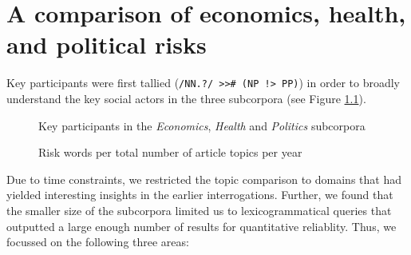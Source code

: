 
\chapter{A comparison of economics, health, and political risks}


Key participants were first tallied (\texttt{/NN.?/ \textgreater \textgreater \# (NP !> PP)}) in order to broadly understand the key social actors in the three subcorpora (see Figure \ref{fig:clouds}).

			\begin{figure}[htb!]
			\centering
			\caption{Key participants in the \emph{Economics}, \emph{Health} and \emph{Politics} subcorpora}
			\label{fig:clouds}
			\end{figure}

			\begin{figure}[htb!]
			\centering
			\caption{Risk words per total number of article topics per year}
			\label{fig:echepol_riskwords}
			\end{figure}
			Due to time constraints, we restricted the topic comparison to domains that had yielded interesting insights in the earlier interrogations. Further, we found that the smaller size of the subcorpora limited us to lexicogrammatical queries that outputted a large enough number of results for quantitative reliablity. Thus, we focussed on the following three areas:

